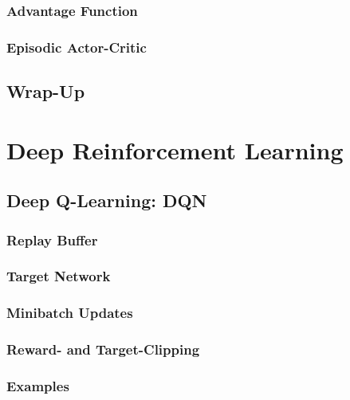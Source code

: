 		\subsection{Advantage Function} %

		\subsection{Episodic Actor-Critic} %

	\section{Wrap-Up} %

\chapter{Deep Reinforcement Learning} %

	\section{Deep Q-Learning: DQN} %

		\subsection{Replay Buffer} %

		\subsection{Target Network} %

		\subsection{Minibatch Updates} %

		\subsection{Reward- and Target-Clipping} %

		\subsection{Examples} %

